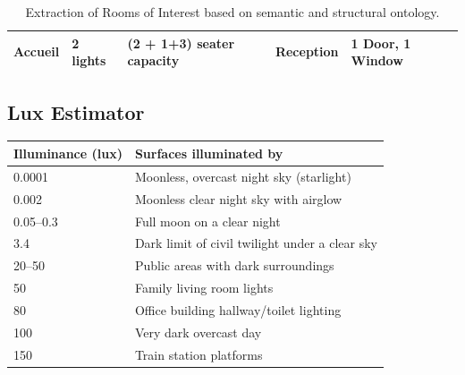 \begin{table}[]
\begin{tabular}{|l|l|l|l|l|}
Accueil           & 2 lights                 & (2 + 1+3) seater capacity                                                                                              & Reception                 & 1 Door, 1 Window           \\ \hline
\end{tabular}
\caption{Extraction of Rooms of Interest based on semantic and structural ontology. }
\label{table:semanticSpace}
\end{table}
 
 
 
\newpage
\subsection{Lux Estimator}
\begin{center}
\begin{table}[]
 \centering 
\begin{tabular}{ll}
\hline
\multicolumn{1}{c}{\textbf{Illuminance (lux)}} & \textbf{Surfaces illuminated by}                                            \\ \hline
\multicolumn{1}{|l|}{0.0001}                   & \multicolumn{1}{l|}{Moonless, overcast night sky (starlight)}               \\ \hline
\multicolumn{1}{|l|}{0.002}                    & \multicolumn{1}{l|}{Moonless clear night sky with airglow}                  \\ \hline
\multicolumn{1}{|l|}{0.05–0.3}                 & \multicolumn{1}{l|}{Full moon on a clear night}                             \\ \hline
\multicolumn{1}{|l|}{3.4}                      & \multicolumn{1}{l|}{Dark limit of civil twilight under a clear sky}         \\ \hline
\multicolumn{1}{|l|}{20–50}                    & \multicolumn{1}{l|}{Public areas with dark surroundings}                    \\ \hline
\multicolumn{1}{|l|}{50}                       & \multicolumn{1}{l|}{Family living room lights}
\\ \hline
\multicolumn{1}{|l|}{80}                       & \multicolumn{1}{l|}{Office building hallway/toilet lighting } \\ \hline
\multicolumn{1}{|l|}{100}                      & \multicolumn{1}{l|}{Very dark overcast day }                          \\ \hline
\multicolumn{1}{|l|}{150}                      & \multicolumn{1}{l|}{Train station platforms }                        \\ \hline

\end{tabular}
\end{table}
\end{center}
